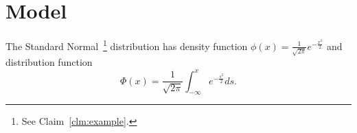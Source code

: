 
\section{Model}

The Standard Normal~\footnote{See Claim~\ref{clm:example}.} distribution has density function \( \phi(x) = \frac{1}{\sqrt{2 \pi}} e^{-\frac{x^2}{2}} \) and distribution function
\[
	\Phi(x) = \frac{1}{\sqrt{2 \pi}} \int_{-\infty}^x e^{-\frac{s^2}{2}}ds.
\]

\begin{comment}
This is a multiline or block comment.
The `comment` environment is provided by the `verbatim` package.

All this stuff is just ignored.
\end{comment}
